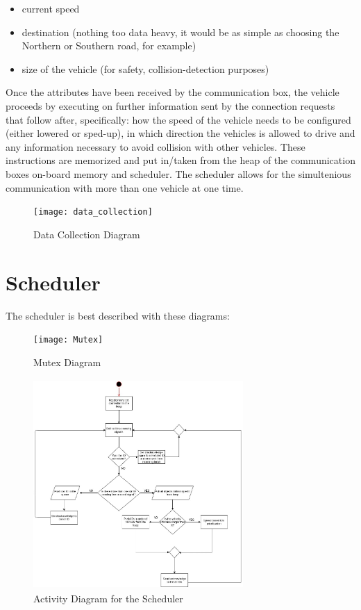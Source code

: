 \documentclass[conference]{IEEEtran}
\begin{document}
\begin{itemize}
	\item current speed
	\item destination (nothing too data heavy, it would be as simple as choosing the Northern or Southern road, for example)
	\item size of the vehicle (for safety, collision-detection purposes)
\end{itemize} 
Once the attributes have been received by the communication box, the vehicle proceeds by executing on further information sent by the connection requests that follow after, specifically: how the speed of the vehicle needs to be configured (either lowered or sped-up), in which direction the vehicles is allowed to drive and any information necessary to avoid collision with other vehicles. These instructions are memorized and put in/taken from the heap of the communication boxes on-board memory and scheduler. The scheduler allows for the simultenious communication with more than one vehicle at one time.
\begin{figure}[h!]
	\centerline{\texttt{[image: data\_collection]}}
	\caption{Data Collection Diagram}
\end{figure}
\section{Scheduler}
 The scheduler is best described with these diagrams: 
 \begin{figure}[h!]
 	\centerline{\texttt{[image: Mutex]}}
 	\caption{Mutex Diagram}
 \end{figure}
 \begin{figure}[h!]
	\includegraphics[width=8cm, height=8cm]{Activity_diagram_for_scheduler}
	\caption{Activity Diagram for the Scheduler}
	\centering
\end{figure}
\end{document}
